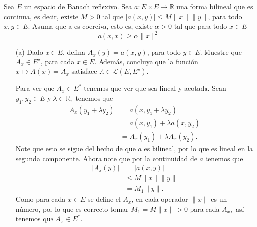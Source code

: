   Sea $E$ un espacio de Banach reflexivo. Sea  $a:E \times E \to \mathbb{R}$ una forma bilineal que es continua, es decir, existe $M>0$ tal que $|a(x, y)| \leq M\|x\|\|y\|$, para todo $x, y \in E$. Asuma que a es coerciva, esto es, existe $\alpha>0$ tal que para todo $x \in E$
$$
a(x, x) \geq \alpha\|x\|^2
$$
\begin{itemize}
    \item[(a)]Dado $x \in E$, defina $A_x(y)=a(x, y)$, para todo $y \in E$. Muestre que $A_x \in E^{\star}$, para cada $x \in E$. Además, concluya que la función $x \mapsto A(x)=A_x$ satisface $A \in \mathcal{L}\left(E, E^{\star}\right)$. 
    \begin{sproof}
      Para ver que $A_x\in E^*$ tenemos que ver que sea lineal y acotada. Sean $y_1,y_2\in E$ y $\lambda\in \mathbb{R},$ tenemos que
      \begin{align*}
        A_x(y_1+\lambda y_2)&=a(x,y_1+\lambda y_2)\\
        &=a(x,y_1)+\lambda a(x,y_2)\\
        &=A_x(y_1)+\lambda A_x(y_2).
      \end{align*}
      Note que esto se sigue del hecho de que $a$ es bilineal, por lo que es lineal en la segunda componente. Ahora note que por la continuidad de $a$ tenemos que
      \begin{align*}
        |A_x(y)|&=|a(x,y)|\\
        &\leq M\|x\|\|y\|\\
        &=M_1\|y\|.
      \end{align*}
      Como para cada $x\in E$ se define el $A_x$, en cada operador $\|x\|$ es un número, por lo que es correcto tomar $M_1=M\|x\|>0$ para cada $A_x,$ así tenemos que $A_x\in E^*.$\\


\end{sproof}
\end{itemize}

